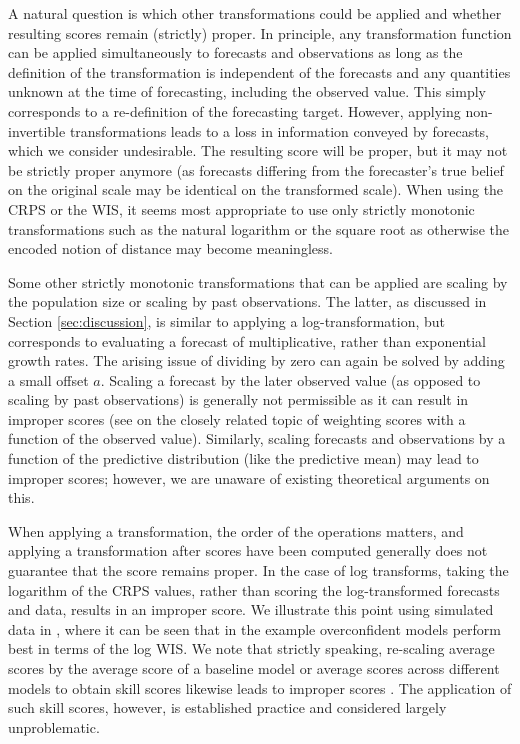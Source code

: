 \documentclass[10pt,letterpaper]{article}
\begin{document}
A natural question is which other transformations could be applied and whether resulting scores remain (strictly) proper. In principle, any transformation function can be applied simultaneously to forecasts and observations as long as the definition of the transformation is independent of the forecasts and any quantities unknown at the time of forecasting, including the observed value. This simply corresponds to a re-definition of the forecasting target. However, applying non-invertible transformations leads to a loss in information conveyed by forecasts, which we consider undesirable. The resulting score will be proper, but it may not be strictly proper anymore (as forecasts differing from the forecaster's true belief on the original scale may be identical on the transformed scale). When using the CRPS or the WIS, it seems most appropriate to use only strictly monotonic transformations such as the natural logarithm or the square root as otherwise the encoded notion of distance may become meaningless. 

Some other strictly monotonic transformations that can be applied are scaling by the population size or scaling by past observations. The latter, as discussed in Section \ref{sec:discussion}, is similar to applying a log-transformation, but corresponds to evaluating a forecast of multiplicative, rather than exponential growth rates. The arising issue of dividing by zero can again be solved by adding a small offset $a$. Scaling a forecast by the later observed value (as opposed to scaling by past observations) is generally not permissible as it can result in improper scores (see \cite{lerchForecasterDilemmaExtreme2015} on the closely related topic of weighting scores with a function of the observed value). Similarly, scaling forecasts and observations by a function of the predictive distribution (like the predictive mean) may lead to improper scores; however, we are unaware of existing theoretical arguments on this. 

When applying a transformation, the order of the operations matters, and applying a transformation after scores have been computed generally does not guarantee that the score remains proper. In the case of log transforms, taking the logarithm of the CRPS values, rather than scoring the log-transformed forecasts and data, results in an improper score. We illustrate this point using simulated data in , where it can be seen that in the example overconfident models perform best in terms of the log WIS. We note that strictly speaking, re-scaling average scores by the average score of a baseline model or average scores across different models  to obtain skill scores likewise leads to improper scores \cite{gneitingStrictlyProperScoring2007}. The application of such skill scores, however, is established practice and considered largely unproblematic.
\end{document}
